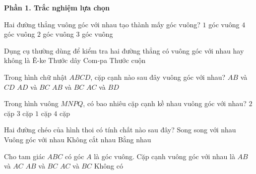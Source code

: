 \textbf{Phần 1. Trắc nghiệm lựa chọn}

\begin{ex} %
Hai đường thẳng vuông góc với nhau tạo thành mấy góc vuông?
\choice
{$1$ góc vuông}
{\True $4$ góc vuông}
{$2$ góc vuông}
{$3$ góc vuông}
\end{ex}

\begin{ex} %
Dụng cụ thường dùng để kiểm tra hai đường thẳng có vuông góc với nhau hay không là
\choice
{\True Ê-ke}
{Thước dây}
{Com-pa}
{Thước cuộn}
\end{ex}

\begin{ex} %
Trong hình chữ nhật $ABCD$, cặp cạnh nào sau đây vuông góc với nhau?
\choice
{$AB$ và $CD$}
{$AD$ và $BC$}
{\True $AB$ và $BC$}
{$AC$ và $BD$}
\end{ex}

\begin{ex} %
Trong hình vuông $MNPQ$, có bao nhiêu cặp cạnh kề nhau vuông góc với nhau?
\choice
{$2$ cặp}
{$3$ cặp}
{$1$ cặp}
{\True $4$ cặp}
\end{ex}

\begin{ex} %
Hai đường chéo của hình thoi có tính chất nào sau đây?
\choice
{Song song với nhau}
{\True Vuông góc với nhau}
{Không cắt nhau}
{Bằng nhau}
\end{ex}

\begin{ex} %
Cho tam giác $ABC$ có góc $A$ là góc vuông. Cặp cạnh vuông góc với nhau là
\choice
{\True $AB$ và $AC$}
{$AB$ và $BC$}
{$AC$ và $BC$}
{Không có}
\end{ex}

